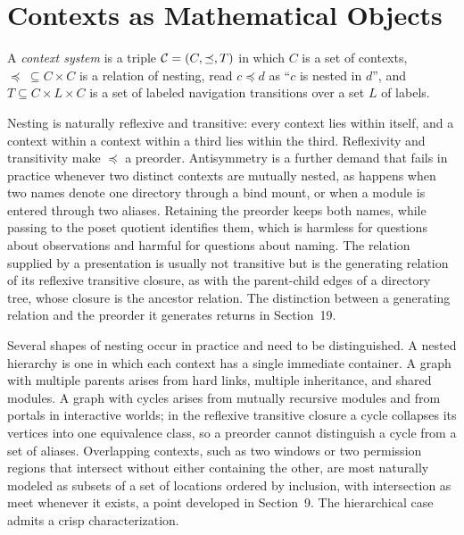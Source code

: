 \section{Contexts as Mathematical Objects}

\begin{definition}\label{def:ctxsys}
A \emph{context system} is a triple $\mathcal C=(C,\preceq,T)$ in which $C$ is a set of contexts, $\preceq\;\subseteq C\times C$ is a relation of nesting, read $c\preceq d$ as ``$c$ is nested in $d$'', and $T\subseteq C\times L\times C$ is a set of labeled navigation transitions over a set $L$ of labels.
\end{definition}

Nesting is naturally reflexive and transitive: every context lies within itself, and a context within a context within a third lies within the third. Reflexivity and transitivity make $\preceq$ a preorder. Antisymmetry is a further demand that fails in practice whenever two distinct contexts are mutually nested, as happens when two names denote one directory through a bind mount, or when a module is entered through two aliases. Retaining the preorder keeps both names, while passing to the poset quotient identifies them, which is harmless for questions about observations and harmful for questions about naming. The relation supplied by a presentation is usually not transitive but is the generating relation of its reflexive transitive closure, as with the parent-child edges of a directory tree, whose closure is the ancestor relation. The distinction between a generating relation and the preorder it generates returns in Section~19.

Several shapes of nesting occur in practice and need to be distinguished. A nested hierarchy is one in which each context has a single immediate container. A graph with multiple parents arises from hard links, multiple inheritance, and shared modules. A graph with cycles arises from mutually recursive modules and from portals in interactive worlds; in the reflexive transitive closure a cycle collapses its vertices into one equivalence class, so a preorder cannot distinguish a cycle from a set of aliases. Overlapping contexts, such as two windows or two permission regions that intersect without either containing the other, are most naturally modeled as subsets of a set of locations ordered by inclusion, with intersection as meet whenever it exists, a point developed in Section~9. The hierarchical case admits a crisp characterization.

